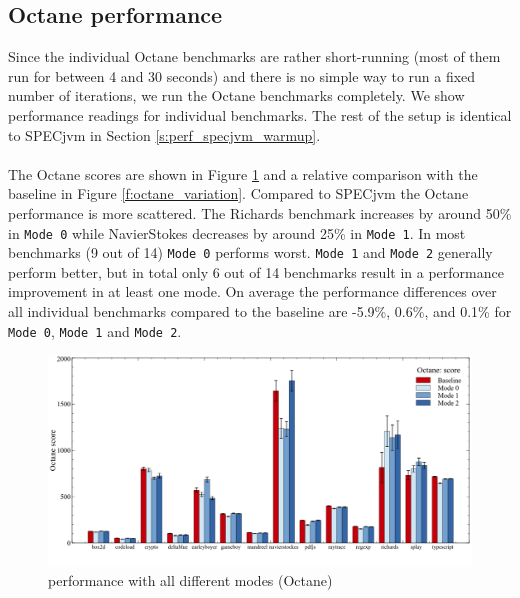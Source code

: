 \subsection{Octane performance}
\label{s:perf_octane}
Since the individual Octane benchmarks are rather short-running (most of them run for between 4 and 30 seconds) and there is no simple way to run a fixed number of iterations, we run the Octane benchmarks completely. We show performance readings for individual benchmarks. The rest of the setup is identical to SPECjvm in Section \ref{s:perf_specjvm_warmup}.
\\\\
The Octane scores are shown in Figure \ref{f:octane} and a relative comparison with the baseline in Figure \ref{f:octane_variation}.
Compared to SPECjvm the Octane performance is more scattered. The Richards benchmark increases by around 50\% in \texttt{Mode 0} while NavierStokes decreases by around 25\% in \texttt{Mode 1}. In most benchmarks (9 out of 14) \texttt{Mode 0} performs worst.
\texttt{Mode 1} and \texttt{Mode 2} generally perform better, but in total only 6 out of 14 benchmarks result in a performance improvement in at least one mode.
On average the performance differences over all individual benchmarks compared to the baseline are -5.9\%, 0.6\%, and 0.1\% for \texttt{Mode 0}, \texttt{Mode 1} and \texttt{Mode 2}.
\begin{figure}[ht]
  \begin{center}
    \centering
    \includegraphics[width=1.0\textwidth]{figures/octane.png}
    \caption{performance with all different modes (Octane)}
    \label{f:octane}
  \end{center}
\end{figure}

